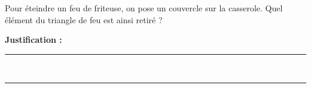 Pour éteindre un feu de friteuse, on pose un couvercle sur la casserole. Quel élément du triangle de feu est ainsi retiré ?

\choices

\noindent\textbf{Justification :} \hrulefill \\[2.5ex]
\rule{\linewidth}{0.4pt} \\[2.5ex]
\rule{\linewidth}{0.4pt}
\vfill
